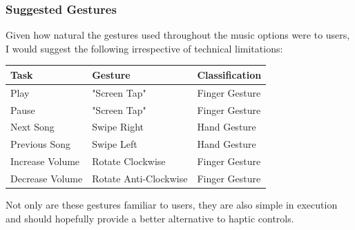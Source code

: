 \documentclass{l4proj}
\begin{document}
\subsubsection{Suggested Gestures}
\vspace{-3mm}

Given how natural the gestures used throughout the music options were to users, I would suggest the following irrespective of technical limitations:

\begin{table}[h!]
\centering
    \begin{tabular}{|l|l|l|}
    \hline
    Task            & Gesture               & Classification \\ \hline
    Play            & "Screen Tap"          & Finger Gesture \\ \hline
    Pause           & "Screen Tap"          & Finger Gesture \\ \hline
    Next Song       & Swipe Right           & Hand Gesture   \\ \hline
    Previous Song   & Swipe Left            & Hand Gesture   \\ \hline
    Increase Volume & Rotate Clockwise      & Finger Gesture \\ \hline
    Decrease Volume & Rotate Anti-Clockwise & Finger Gesture \\ \hline
    \end{tabular}
\end{table}

Not only are these gestures familiar to users, they are also simple in execution and should hopefully provide a better alternative to haptic controls.
\end{document}
